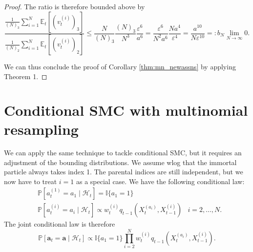 \documentclass[fleqn]{article}
\theoremstyle{definition}
\newcommand{\PR}{\mathbb{P}}
\newcommand{\E}{\mathbb{E}}
\newcommand{\I}[1]{\mathbb{I}\{#1\}}
\newcommand{\1}[1]{\mathbbm{1}_{\{#1\}}}
\newcommand{\limNtoinfty}{\underset{N\to\infty}{\lim}}
\newcommand{\vt}[2][t]{v_{#1}^{(#2)}}
\newcommand{\wt}[2][t]{w_{#1}^{(#2)}}
\begin{document}
\begin{proof}
The ratio is therefore bounded above by
\begin{equation*}
\frac{\frac{1}{(N)_3} \sum_{i=1}^N \E_t[(\vt{i})_3]}{\frac{1}{(N)_2} \sum_{i=1}^N \E_t[(\vt{i})_2]}
\leq \frac{N}{(N)_3} \frac{(N)_3}{N^3}\frac{\varepsilon^6}{a^6}
= \frac{\varepsilon^6}{N^2a^6} \frac{Na^4}{\varepsilon^4} = \frac{a^{10}}{N\varepsilon^{10}} =: b_N \limNtoinfty 0.
\end{equation*}

We can thus conclude the proof of Corollary \ref{thm:mn_newassns} by applying Theorem 1.
\end{proof}


\section*{Conditional SMC with multinomial resampling}
We can apply the same technique to tackle conditional SMC, but it requires an adjustment of the bounding distributions.
We assume wlog that the immortal particle always takes index 1.
The parental indices are still independent, but we now have to treat $i=1$ as a special case. We have the following conditional law:
\begin{align*}
&\PR [a_t^{(1)} = a_1 \mid \mathcal{H}_t] = \I{a_1=1}  & \\
&\PR [a_t^{(i)} = a_i \mid \mathcal{H}_t] \propto \wt{i} q_{t-1}(X_t^{(a_i)}, X_{t-1}^{(i)}) & i=2,\dots,N .
\end{align*}
The joint conditional law is therefore
\begin{equation*}
\PR [\mathbf{a}_t = \mathbf{a} \mid \mathcal{H}_t] \propto \I{a_1 = 1} \prod_{i=2}^N \wt{i} q_{t-1}(X_t^{(a_i)}, X_{t-1}^{(i)}).
\end{equation*}
\end{document}
